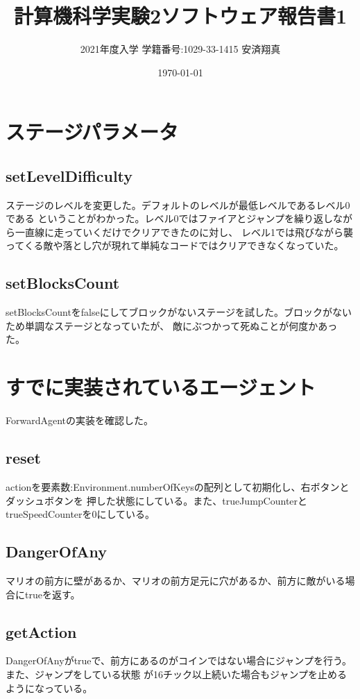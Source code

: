\documentclass[a4paper,11pt]{jsarticle}
\begin{document}
\title{計算機科学実験2ソフトウェア報告書1}
\author{2021年度入学 学籍番号:1029-33-1415 安済翔真}
\date{\today}
\maketitle

\section*{ステージパラメータ}
\subsection*{setLevelDifficulty}
ステージのレベルを変更した。デフォルトのレベルが最低レベルであるレベル0である
ということがわかった。レベル0ではファイアとジャンプを繰り返しながら一直線に走っていくだけでクリアできたのに対し、
レベル1では飛びながら襲ってくる敵や落とし穴が現れて単純なコードではクリアできなくなっていた。

\subsection*{setBlocksCount}
setBlocksCountをfalseにしてブロックがないステージを試した。ブロックがないため単調なステージとなっていたが、
敵にぶつかって死ぬことが何度かあった。

\section*{すでに実装されているエージェント}
ForwardAgentの実装を確認した。

\subsection*{reset}
actionを要素数:Environment.numberOfKeysの配列として初期化し、右ボタンとダッシュボタンを
押した状態にしている。また、trueJumpCounterとtrueSpeedCounterを0にしている。

\subsection*{DangerOfAny}
マリオの前方に壁があるか、マリオの前方足元に穴があるか、前方に敵がいる場合にtrueを返す。

\subsection*{getAction}
DangerOfAnyがtrueで、前方にあるのがコインではない場合にジャンプを行う。また、ジャンプをしている状態
が16チック以上続いた場合もジャンプを止めるようになっている。


\printbibliography[title=参考文献]
\end{document}
